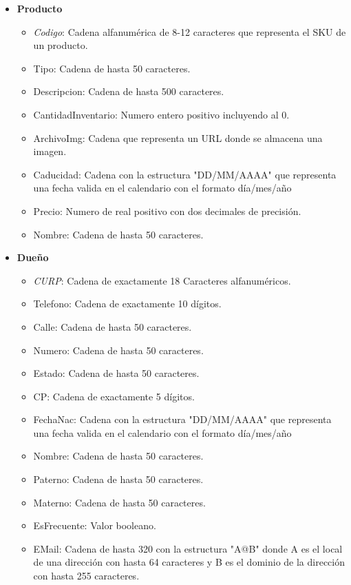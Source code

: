 \documentclass{exam}
\begin{document}
\begin{itemize}
	\item \textbf{Producto}
		\begin{itemize}
			\item \textit{Codigo}: Cadena alfanumérica de 8-12 caracteres que representa el SKU de un producto.
			\item Tipo: Cadena de hasta 50 caracteres.
			\item Descripcion: Cadena de hasta 500 caracteres.
			\item CantidadInventario: Numero entero positivo incluyendo al 0.
			\item ArchivoImg: Cadena que representa un URL donde se almacena una imagen.
			\item Caducidad: Cadena con la estructura "DD/MM/AAAA" que representa una fecha valida en el calendario con el formato día/mes/año
			\item Precio: Numero de real positivo con dos decimales de precisión.
			\item Nombre: Cadena de hasta 50 caracteres.
		\end{itemize}
		
	\item \textbf{Dueño}
		\begin{itemize}
			\item \textit{CURP}: Cadena de exactamente 18 Caracteres alfanuméricos.
			\item Telefono: Cadena de exactamente 10 dígitos.
			\item Calle: Cadena de hasta 50 caracteres.
			\item Numero: Cadena de hasta 50 caracteres.
			\item Estado: Cadena de hasta 50 caracteres.
			\item CP: Cadena de exactamente 5 dígitos.
			\item FechaNac: Cadena con la estructura "DD/MM/AAAA" que representa una fecha valida en el calendario con el formato día/mes/año
			\item Nombre: Cadena de hasta 50 caracteres.
			\item Paterno: Cadena de hasta 50 caracteres.
			\item Materno: Cadena de hasta 50 caracteres.
			\item EsFrecuente: Valor booleano.
			\item EMail: Cadena de hasta 320 con la estructura "A@B" donde A es el local de una dirección con hasta 64 caracteres y B es el dominio de la dirección con hasta 255 caracteres.
		\end{itemize}
		

\end{itemize}
\end{document}
